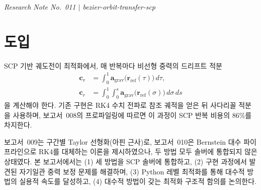 \documentclass[11pt]{article}
\begin{document}
\drawborder
\thispagestyle{firstpage}


{\normalsize\textit{Research Note No.~011 $|$ bezier-orbit-transfer-scp}}\par\medskip

\def\lighterdate{March 28, 2026}


\begin{abstract}
보고서 009(아핀 근사)\cite{report009}와 010(Bernstein 대수)\cite{report010}에서
제안한 드리프트 적분 가속 방법론을 SCP 솔버에 통합하고, 구현 과정에서 발견된
자기일관 중력 보정 문제를 해결한다.
\texttt{bern\_product}/\texttt{bern\_compose}의 벡터화, 가중치 행렬 캐싱,
워밍스타트, 적응적 조기 종료, 보정용 $K$ 분리를 적용하여
초기 Python 구현 대비 \textbf{180배} 속도 향상을 달성하였다.
최종 벤치마크에서 아핀 방법(수치 보정)은 RK4 대비 \textbf{1.97배},
아핀 방법(대수 보정)은 \textbf{1.33배} 빠르면서 유사한 비용과 수렴을 보인다.
마지막으로, 대수적 보정이 연산 속도보다는 \textbf{제어점 최적화 구조의 보존}에
본질적 가치를 가짐을 논의한다.
\end{abstract}

\section{도입}

SCP 기반 궤도전이 최적화에서, 매 반복마다 비선형 중력의 드리프트 적분
\begin{align}
  \mathbf{c}_v &= \int_0^1 \mathbf{a}_{\mathrm{grav}}\!\bigl(\mathbf{r}_{\mathrm{ref}}(\tau)\bigr)\,d\tau, \label{eq:cv}\\
  \mathbf{c}_r &= \int_0^1\!\int_0^s \mathbf{a}_{\mathrm{grav}}\!\bigl(\mathbf{r}_{\mathrm{ref}}(\sigma)\bigr)\,d\sigma\,ds \label{eq:cr}
\end{align}
을 계산해야 한다\cite{report006}.
기존 구현은 RK4 수치 전파로 참조 궤적을 얻은 뒤 사다리꼴 적분을 사용하며,
보고서~008\cite{report008}의 프로파일링에 따르면 이 과정이 SCP 반복 비용의
86\%를 차지한다.

보고서~009\cite{report009}는 구간별 Taylor 선형화(아핀 근사)로,
보고서~010\cite{report010}은 Bernstein 대수 파이프라인으로
RK4를 대체하는 이론을 제시하였으나, 두 방법 모두 솔버에 통합되지 않은
상태였다.
본 보고서에서는 (1) 세 방법을 SCP 솔버에 통합하고,
(2) 구현 과정에서 발견된 자기일관 중력 보정 문제를 해결하며,
(3) Python 레벨 최적화를 통해 대수적 방법의 실용적 속도를 달성하고,
(4) 대수적 방법이 갖는 최적화 구조적 함의를 논의한다.
\end{document}
